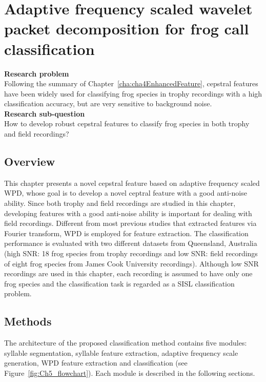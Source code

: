 
\chapter{Adaptive frequency scaled wavelet packet decomposition for frog call classification}
\label{cha:cha5WaveletFeature}


\textbf{Research problem}
\\
Following the summary of Chapter~\ref{cha:cha4EnhancedFeature}, cepstral features have been widely used for classifying frog species in trophy recordings with a high classification accuracy, but are very sensitive to background noise.
\\
\textbf{Research sub-question}
\\
How to develop robust cepstral features to classify frog species in both trophy and field recordings?




\section{Overview}

This chapter presents a novel cepstral feature based on adaptive frequency scaled WPD, whose goal is to develop a novel ceptral feature with a good anti-noise ability.
Since both trophy and field recordings are studied in this chapter, developing features with a good anti-noise ability is important for dealing with field recordings. Different from most previous studies that extracted features via Fourier transform, WPD is employed for feature extraction. The classification performance is evaluated with two different datasets from Queensland, Australia (high SNR: 18 frog species from trophy recordings and low SNR: field recordings of eight frog species from James Cook University recordings).  
Although low SNR recordings are used in this chapter, each recording is assumed to have only one frog species and the classification task is regarded as a SISL classification problem.







\section{Methods}
The architecture of the proposed classification method contains five modules: syllable segmentation, syllable feature extraction, adaptive frequency scale generation, WPD feature extraction and classification (see Figure~\ref{fig:Ch5_flowchart}). Each module is described in the following sections. 

